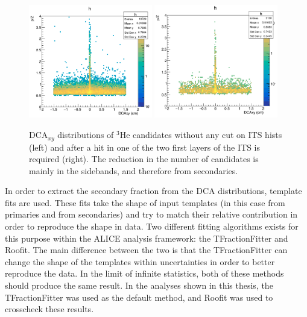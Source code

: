 \begin{figure}
    \centering
    \includegraphics[width=0.48\textwidth]{figures/DCA_dist_3he_no_cut.png}
    \includegraphics[width=0.48\textwidth]{figures/DCA_dist_3he_ITSNClusters_cut.png}
    \caption{DCA$_{xy}$ distributions of $^3\mathrm{He}$ candidates without any cut on ITS hists (left) and after a hit in one of the two first layers of the ITS is required (right). The reduction in the number of candidates is mainly in the sidebands, and therefore from secondaries.}
    \label{fig:DCA_dist_ITS_cut_effect}
\end{figure}
In order to extract the secondary fraction from the DCA distributions, template fits are used. These fits take the shape of input templates (in this case from primaries and from secondaries) and try to match their relative contribution in order to reproduce the shape in data. Two different fitting algorithms exists for this purpose within the ALICE analysis framework: the TFractionFitter and Roofit. The main difference between the two is that the TFractionFitter can change the shape of the templates within uncertainties in order to better reproduce the data. In the limit of infinite statistics, both of these methods should produce the same result. In the analyses shown in this thesis, the TFractionFitter was used as the default method, and Roofit was used to crosscheck these results. \\
